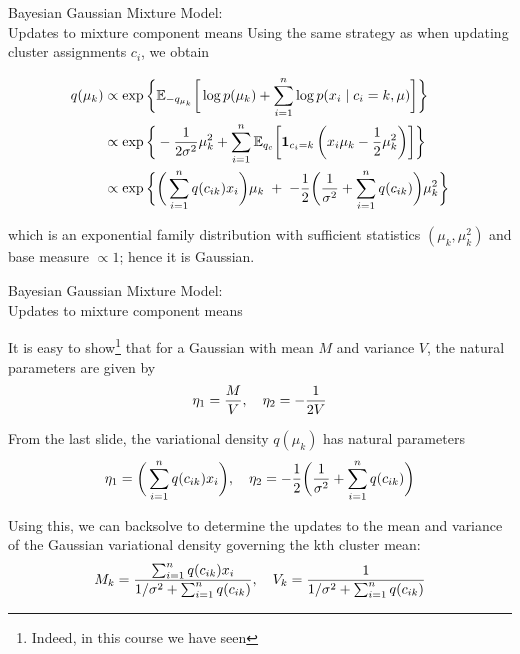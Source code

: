 \documentclass[10pt]{beamer}
\begin{document}
\begin{frame}{Bayesian Gaussian Mixture Model: \\ Updates to mixture component means}
Using the same strategy as when updating cluster assignments $c_i$, we obtain

\begin{align*}
q(\mu_k) & \propto \exp \bigg\{ \mathbb{E}_{-q_{\mu_k}} \bigg[  \log p(\mu_k) + \displaystyle\sum_{i=1}^n \log p(x_i \; | \; c_i=k, \mu) \bigg] \bigg\} \\
& \propto \exp \bigg\{ -\displaystyle\frac{1}{2  \sigma^2} \mu_k^2 +  \displaystyle\sum_{i=1}^{n} \mathbb{E}_{q_c} \bigg[ {\boldsymbol 1}_{c_i=k}\, \bigg(x_i \mu_k - \displaystyle\frac{1}{2} \mu_k^2\bigg) \bigg] \bigg\} \\
& \propto \exp \bigg\{  \bigg( \displaystyle\sum_{i=1}^n q(c_{ik})x_i  \bigg) \mu_k   \; +  \; -\displaystyle\frac{1}{2} \bigg(\displaystyle\frac{1}{ \sigma^2} + \displaystyle\sum_{i=1}^n q(c_{ik}) \bigg) \mu_k^2 \bigg\} \\
\end{align*}


 
which is an exponential family distribution with sufficient statistics $(\mu_k, \mu_k^2)$  and base measure $\propto 1$; hence it is Gaussian. 

\end{frame}

\begin{frame}{Bayesian Gaussian Mixture Model: \\ Updates to mixture component means}

It is easy to show\footnote{\tiny Indeed, in this course we have seen} that for a Gaussian with mean $M$ and variance $V$, the natural parameters are given by
 \[\eta_1 = \displaystyle\frac{M}{V}, \quad \eta_2 = -\displaystyle\frac{1}{2V} \]
 
From the last slide, the variational density $q(\mu_k)$ has natural parameters
\[ \eta_1 = \bigg( \displaystyle\sum_{i=1}^n q(c_{ik})x_i  \bigg) , \quad \eta_2 = -\displaystyle\frac{1}{2} \bigg(\displaystyle\frac{1}{ \sigma^2} + \displaystyle\sum_{i=1}^n q(c_{ik}) \bigg) \]


 
   Using this, we can backsolve to determine the updates to the mean and variance of the Gaussian variational density governing the kth cluster mean:
\[ M_k = \displaystyle\frac{\sum_{i=1}^n q(c_{ik}) x_i}{1/\sigma^2 + \sum_{i=1}^n q(c_{ik})}, \quad V_k= \displaystyle\frac{1}{1/\sigma^2 +\sum_{i=1}^n q(c_{ik})}\]
\end{frame}
\end{document}
